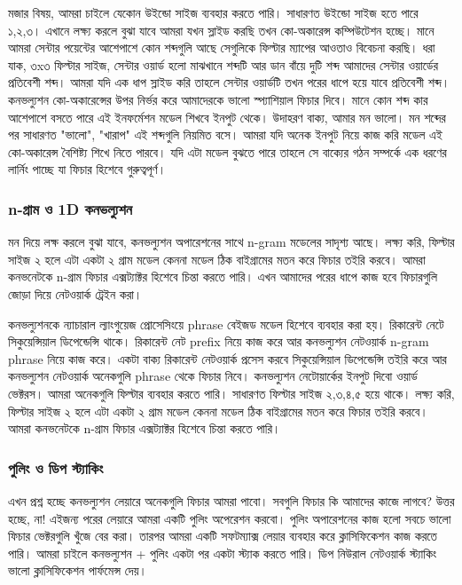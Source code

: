 \documentclass{article}[book]
\begin{document}
মজার বিষয়,  আমরা চাইলে যেকোন উইন্ডো সাইজ ব্যবহার করতে পারি। সাধারণত উইন্ডো সাইজ হতে পারে ১,২,৩। 
এখানে লক্ষ্য করলে বুঝা যাবে আমরা যখন স্লাইড করছি তখন কো-অকারেন্স কম্পিউটেশন হচ্ছে। মানে আমরা সেন্টার পয়েন্টের আশেপাশে কোন শব্দগুলি আছে সেগুলিকে ফিল্টার ম্যাপের আওতাও বিবেচনা করছি।
ধরা যাক, ৩x৩ ফিল্টার সাইজ, সেন্টার ওয়ার্ড হলো মাঝখানে শব্দটি আর ডান বাঁয়ে দুটি শব্দ আমাদের সেন্টার ওয়ার্ডের প্রতিবেশী শব্দ। আমরা যদি এক ধাপ স্লাইড করি তাহলে সেন্টার ওয়ার্ডটি 
তখন পরের ধাপে হয়ে যাবে প্রতিবেশী শব্দ। কনভল্যুশন কো-অকারেন্সের উপর নির্ভর করে আমাদেরকে ভালো স্প্যাশিয়াল ফিচার দিবে। মানে কোন শব্দ কার আশেপাশে বসতে পারে এই ইনফর্মেশন 
মডেল শিখবে ইনপুট থেকে। উদাহরণ বাক্য, আমার মন ভালো। মন শব্দের পর সাধারণত "ভালো",  "খারাপ" এই শব্দগুলি নিয়মিত বসে। আমরা যদি অনেক ইনপুট নিয়ে কাজ করি মডেল এই কো-অকারেন্স 
বৈশিষ্ট্য শিখে নিতে পারবে। যদি এটা মডেল বুঝতে পারে তাহলে সে বাক্যের গঠন সম্পর্কে এক ধরণের লার্নিং পাচ্ছে যা ফিচার হিশেবে গুরুত্বপূর্ণ।

\subsubsection{n-গ্রাম ও 1D কনভল্যুশন}
মন দিয়ে লক্ষ করলে বুঝা যাবে, কনভল্যুশন অপারেশনের সাথে n-gram মডেলের সাদৃশ্য আছে। 
লক্ষ্য করি, ফিল্টার সাইজ ২ হলে এটা একটা ২ গ্রাম মডেল কেননা মডেল ঠিক বাইগ্রামের মতন করে ফিচার তইরি করবে। 
আমরা কনভনেটকে n-গ্রাম ফিচার এক্সট্যাক্টর হিশেবে চিন্তা করতে পারি। এখন আমাদের পরের ধাপে কাজ হবে ফিচারগুলি জোড়া দিয়ে নেটওয়ার্ক ট্রেইন করা।

কনভল্যুশনকে ন্যাচারাল ল্যাংগুয়েজ প্রোসেসিংয়ে phrase বেইজড মডেল হিশেবে ব্যবহার করা হয়। রিকারেন্ট নেটে সিকুয়েন্সিয়াল ডিপেন্ডেন্সি থাকে। 
রিকারেন্ট নেট prefix নিয়ে কাজ করে আর কনভল্যুশন নেটওয়ার্ক n-gram phrase নিয়ে কাজ করে।
একটা বাক্য রিকারেন্ট নেটওয়ার্ক প্রসেস করবে সিকুয়েন্সিয়াল ডিপেন্ডেন্সি তইরি করে আর কনভল্যুশন নেটওয়ার্ক অনেকগুলি phrase থেকে ফিচার নিবে। 
কনভল্যুশন নেটোয়ার্কের ইনপুট দিবো ওয়ার্ড ভেক্টরস। আমরা অনেকগুলি ফিল্টার ব্যবহার করতে পারি। সাধারণত ফিল্টার সাইজ ২,৩,৪,৫ হয়ে থাকে। 
লক্ষ্য করি, ফিল্টার সাইজ ২ হলে এটা একটা ২ গ্রাম মডেল কেননা মডেল ঠিক বাইগ্রামের মতন করে ফিচার তইরি করবে। 
আমরা কনভনেটকে n-গ্রাম ফিচার এক্সট্যাক্টর হিশেবে চিন্তা করতে পারি। 

\subsubsection{পুলিং ও ডিপ স্ট্যাকিং}
এখন প্রশ্ন হচ্ছে কনভল্যুশন লেয়ারে অনেকগুলি ফিচার আমরা পাবো। সবগুলি ফিচার কি আমাদের কাজে লাগবে? 
উত্তর হচ্ছে, না! এইজন্য পরের লেয়ারে আমরা একটি পুলিং অপেরেশন করবো। পুলিং অপারেশনের কাজ হলো সবচে ভালো ফিচার ভেক্টরগুলি খুঁজে বের করা। 
তারপর আমরা একটি সফটম্যাক্স লেয়ার ব্যবহার করে ক্লাসিফিকেশন কাজ করতে পারি। আমরা চাইলে কনভল্যুশন + পুলিং একটা পর একটা স্ট্যাক করতে পারি। 
ডিপ নিউরাল নেটওয়ার্ক স্ট্যাকিং ভালো ক্লাসিফিকেশন পার্ফমেন্স দেয়।
\end{document}
